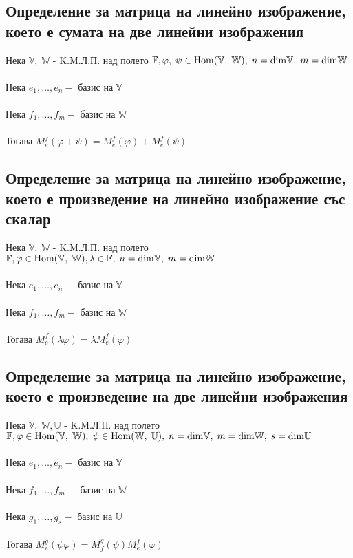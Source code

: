 \documentclass{article}
\newcommand{\V}{\mathbb{V}}
\newcommand{\F}{\mathbb{F}}
\newcommand{\W}{\mathbb{W}}
\newcommand{\UV}{\mathbb{U}}
\newcommand{\n}[1]{#1_1, \dots, #1_n}
\newcommand{\m}[1]{#1_1, \dots, #1_m}
\newcommand{\s}[1]{#1_1, \dots, #1_s}
\begin{document}
    \subsection{Определение за матрица на линейно изображение, което е сумата на две линейни изображения}
    Нека \(\V, \; \W\) - K.M.Л.П. над полето \(\F, \\\\
    \varphi, \; \psi \in \mathrm{Hom}(\V, \; \W), \; n = \mathrm{dim}\V, \; m = \mathrm{dim}\W\) \\\\
    Нека \(\n{e} - \text{ базис на } \V\) \\\\
    Нека \(\m{f} - \text{ базис на } \W\) \\\\
    Тогава \(M_e^f(\varphi + \psi) = M_e^f(\varphi) + M_e^f(\psi)\)
    \subsection{Определение за матрица на линейно изображение, което е произведение на линейно изображение със скалар}
    Нека \(\V, \; \W\) - K.M.Л.П. над полето \(\F, \\\\
    \varphi \in \mathrm{Hom}(\V, \; \W), \lambda \in \F, \; n = \mathrm{dim}\V, \; m = \mathrm{dim}\W\) \\\\
    Нека \(\n{e} - \text{ базис на } \V\) \\\\
    Нека \(\m{f} - \text{ базис на } \W\) \\\\
    Тогава \(M_e^f(\lambda\varphi) = \lambda M_e^f(\varphi)\)
    \subsection{Определение за матрица на линейно изображение, което е произведение на две линейни изображения}
    Нека \(\V, \; \W, \UV\) - K.M.Л.П. над полето \(\F, \\\\
    \varphi \in \mathrm{Hom}(\V, \; \W), \; \psi \in \mathrm{Hom}(\W, \; \UV), \; n = \mathrm{dim}\V, \; m = \mathrm{dim}\W, \; s = \mathrm{dim}\UV\) \\\\
    Нека \(\n{e} - \text{ базис на } \V\) \\\\
    Нека \(\m{f} - \text{ базис на } \W\) \\\\
    Нека \(\s{g} - \text{ базис на } \UV\) \\\\
    Тогава \(M_e^g(\psi\varphi) = M_f^g(\psi)M_e^f(\varphi)\)
\end{document}
